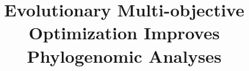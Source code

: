 \documentclass[runningheads]{llncs}
\begin{document}
%
\title{ Evolutionary Multi-objective Optimization Improves Phylogenomic Analyses}
\author{}
\institute{}
%
\maketitle              %
%

 
 







%
%
%



%
\end{document}
